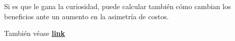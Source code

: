 \begin{itemize}
\begin{solution}
        Si es que le gana la curiosidad, puede calcular también cómo cambian los beneficios ante un aumento en la asimetría de costos.

        También véase \textbf{\href{https://www.geogebra.org/calculator/wvmvmtvj}{\underline{link}}} 
    \end{solution}
\end{itemize}